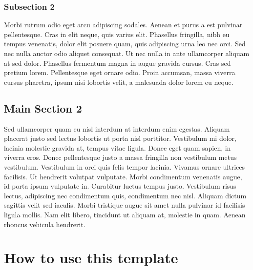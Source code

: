 \documentclass[
12pt, %
english, %
doublespacing, %
nolistspacing, %
liststotoc, %
headsepline, %
chapterinoneline, %
openany, %
]{DoctoralThesis}\usepackage[]{graphicx}\usepackage[]{color}
\begin{document}
\subsection{Subsection 2}
Morbi rutrum odio eget arcu adipiscing sodales. Aenean et purus a est pulvinar pellentesque. Cras in elit neque, quis varius elit. Phasellus fringilla, nibh eu tempus venenatis, dolor elit posuere quam, quis adipiscing urna leo nec orci. Sed nec nulla auctor odio aliquet consequat. Ut nec nulla in ante ullamcorper aliquam at sed dolor. Phasellus fermentum magna in augue gravida cursus. Cras sed pretium lorem. Pellentesque eget ornare odio. Proin accumsan, massa viverra cursus pharetra, ipsum nisi lobortis velit, a malesuada dolor lorem eu neque.


\section{Main Section 2}

Sed ullamcorper quam eu nisl interdum at interdum enim egestas. Aliquam placerat justo sed lectus lobortis ut porta nisl porttitor. Vestibulum mi dolor, lacinia molestie gravida at, tempus vitae ligula. Donec eget quam sapien, in viverra eros. Donec pellentesque justo a massa fringilla non vestibulum metus vestibulum. Vestibulum in orci quis felis tempor lacinia. Vivamus ornare ultrices facilisis. Ut hendrerit volutpat vulputate. Morbi condimentum venenatis augue, id porta ipsum vulputate in. Curabitur luctus tempus justo. Vestibulum risus lectus, adipiscing nec condimentum quis, condimentum nec nisl. Aliquam dictum sagittis velit sed iaculis. Morbi tristique augue sit amet nulla pulvinar id facilisis ligula mollis. Nam elit libero, tincidunt ut aliquam at, molestie in quam. Aenean rhoncus vehicula hendrerit.


\chapter{How to use this template} %

\label{Chapter6} %

\end{document}
